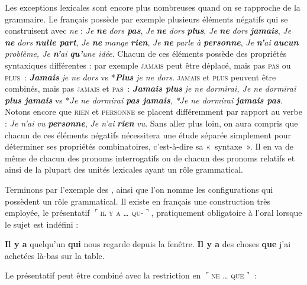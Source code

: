 {    Les exceptions lexicales sont encore plus nombreuses quand on se rapproche de la grammaire. Le français possède par exemple plusieurs éléments négatifs qui se construisent avec \textit{ne} : \textit{Je} \textbf{\textit{ne}} \textit{dors} \textbf{\textit{pas}}, \textit{Je} \textbf{\textit{ne}} \textit{dors} \textbf{\textit{plus}}, \textit{Je} \textbf{\textit{ne}} \textit{dors} \textbf{\textit{jamais}}, \textit{Je} \textbf{\textit{ne}} \textit{dors} \textbf{\textit{nulle part}}, \textit{Je} \textbf{\textit{ne}} \textit{mange} \textbf{\textit{rien}}, \textit{Je} \textbf{\textit{ne}} \textit{parle à} \textbf{\textit{personne}}, \textit{Je} \textbf{\textit{n’}}\textit{ai} \textbf{\textit{aucun}} \textit{problème, Je} \textbf{\textit{n’}}\textit{ai} \textbf{\textit{qu’}}\textit{une idée}. Chacun de ces éléments possède des propriétés syntaxiques différentes : par exemple \textsc{jamais} peut être déplacé, mais pas \textsc{pas} ou \textsc{plus~}: \textbf{\textit{Jamais}} \textit{je ne dors} vs *\textbf{\textit{Plus}} \textit{je ne dors}. \textsc{jamais} et \textsc{plus} peuvent être combinés, mais pas \textsc{jamais} et \textsc{pas~}: \textbf{\textit{Jamais plus}} \textit{je ne dormirai, Je ne dormirai} \textbf{\textit{plus jamais}} vs *\textit{Je ne dormirai} \textbf{\textit{pas jamais}}, \textit{*Je ne dormirai} \textbf{\textit{jamais pas}}. Notons encore que \textsc{rien} et \textsc{personne} se placent différemment par rapport au verbe : \textit{Je n’ai vu} \textbf{\textit{personne}}, \textit{Je n’ai} \textbf{\textit{rien}} \textit{vu}. Sans aller plus loin, on aura compris que chacun de ces éléments négatifs nécessitera une étude séparée simplement pour déterminer ses propriétés combinatoires, c’est-à-dire sa «~syntaxe~». Il en va de même de chacun des pronoms interrogatifs ou de chacun des pronoms relatifs et ainsi de la plupart des unités lexicales ayant un rôle grammatical.

    Terminons par l’exemple des , ainsi que l’on nomme les configurations qui possèdent un rôle grammatical. Il existe en français une construction très employée, le présentatif $⌜$\textsc{il y a … qu-}$⌝$, pratiquement obligatoire à l’oral lorsque le sujet est indéfini :

    \ea
    \ea 
    \textbf{{Il y a}} {quelqu’un} \textbf{{qui}} {nous regarde depuis la fenêtre.}
    \ex
    \textbf{{Il y a}} {des choses} \textbf{{que}} {j’ai} {achetées là-bas} {sur la table.}
    \z
    \z

    Le présentatif peut être combiné avec la restriction en $⌜$\textsc{ne … que}$⌝$ :

}
